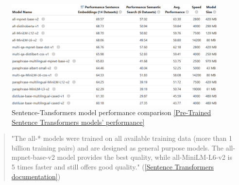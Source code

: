 \begin{figure}[htbp]
    \centering
    \includegraphics[width=\linewidth]{./figures/embedding-modes-performance.png}
    \caption{Sentence-Tansformers model performance comparison \href{https://sbert.net/docs/sentence_transformer/pretrained_models.html}{[Pre-Trained Sentence Transformers models' performance]}}
\end{figure}
\begin{quote}
    "The all-* models were trained on all available training data (more than 1 billion training pairs) and are designed as general purpose models. The all-mpnet-base-v2 model provides the best quality, while all-MiniLM-L6-v2 is 5 times faster and still offers good quality."  (\href{https://sbert.net/docs/sentence_transformer/pretrained_models.html}{[Sentence Transformers documentation]})
\end{quote}
\newpage


